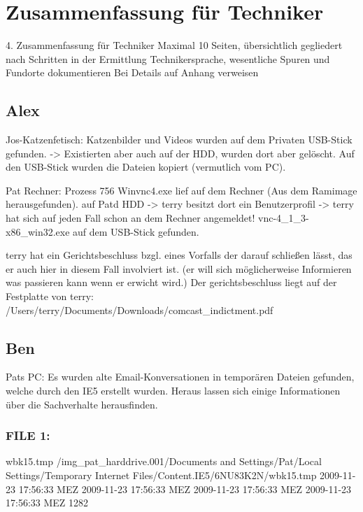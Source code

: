 \chapter{Zusammenfassung für Techniker}
\label{sec:tec}


4. Zusammenfassung für Techniker
Maximal 10 Seiten, übersichtlich gegliedert nach Schritten in der Ermittlung
Technikersprache, wesentliche Spuren und Fundorte dokumentieren
Bei Details auf Anhang verweisen

\section{Alex}
Jos-Katzenfetisch:
Katzenbilder und Videos wurden auf dem Privaten USB-Stick gefunden. -> Existierten aber auch auf der HDD, wurden dort aber gelöscht.
Auf den USB-Stick wurden die Dateien kopiert (vermutlich vom PC).

Pat Rechner:
Prozess 756 Winvnc4.exe lief auf dem Rechner (Aus dem Ramimage herausgefunden).
auf Patd HDD -> terry besitzt dort ein Benutzerprofil -> terry hat sich auf jeden Fall schon an dem Rechner angemeldet!
  vnc-4_1_3-x86_win32.exe auf dem USB-Stick gefunden.

terry hat ein Gerichtsbeschluss bzgl. eines Vorfalls der darauf schließen lässt, das er auch hier in diesem Fall involviert ist. (er will sich möglicherweise Informieren was passieren kann wenn er erwicht wird.)
Der gerichtsbeschluss liegt auf der Festplatte von terry:
/Users/terry/Documents/Downloads/comcast_indictment.pdf

\section{Ben}
Pats PC:
Es wurden alte Email-Konversationen in temporären Dateien gefunden, welche durch den IE5 erstellt wurden.
Heraus lassen sich einige Informationen über die Sachverhalte herausfinden.

\subsection{FILE 1:}
wbk15.tmp	/img_pat_harddrive.001/Documents and Settings/Pat/Local Settings/Temporary Internet Files/Content.IE5/6NU83K2N/wbk15.tmp		2009-11-23 17:56:33 MEZ	2009-11-23 17:56:33 MEZ	2009-11-23 17:56:33 MEZ	2009-11-23 17:56:33 MEZ	1282	


